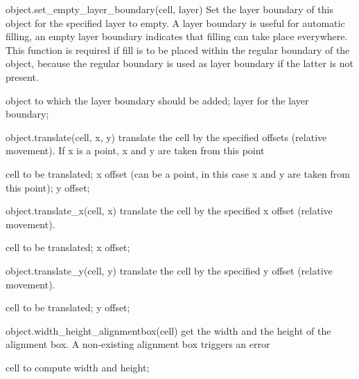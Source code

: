 \begin{APIfunc}{object.set\_empty\_layer\_boundary(cell, layer)}
    Set the layer boundary of this object for the specified layer to empty. A layer boundary is useful for automatic filling, an empty layer boundary indicates that filling can take place everywhere. This function is required if fill is to be placed within the regular boundary of the object, because the regular boundary is used as layer boundary if the latter is not present.
    \begin{APIparameters}
            object to which the layer boundary should be added;
            layer for the layer boundary;
    \end{APIparameters}
\end{APIfunc}
\begin{APIfunc}{object.translate(cell, x, y)}
    translate the cell by the specified offsets (relative movement). If x is a point, x and y are taken from this point
    \begin{APIparameters}
            cell to be translated;
            x offset (can be a point, in this case x and y are taken from this point);
            y offset;
    \end{APIparameters}
\end{APIfunc}
\begin{APIfunc}{object.translate\_x(cell, x)}
    translate the cell by the specified x offset (relative movement).
    \begin{APIparameters}
            cell to be translated;
            x offset;
    \end{APIparameters}
\end{APIfunc}
\begin{APIfunc}{object.translate\_y(cell, y)}
    translate the cell by the specified y offset (relative movement).
    \begin{APIparameters}
            cell to be translated;
            y offset;
    \end{APIparameters}
\end{APIfunc}
\begin{APIfunc}{object.width\_height\_alignmentbox(cell)}
    get the width and the height of the alignment box. A non-existing alignment box triggers an error
    \begin{APIparameters}
            cell to compute width and height;
    \end{APIparameters}
\end{APIfunc}
